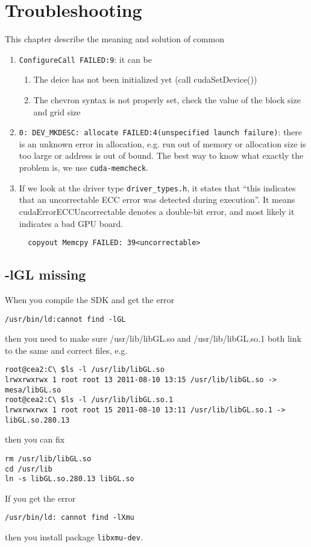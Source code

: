 
\chapter{Troubleshooting}
\label{chap:troubleshooting}


This chapter describe the  meaning and solution of common 
\begin{enumerate}
\item \verb!ConfigureCall FAILED:9!: it can be
  \begin{enumerate}
  \item The deice has not been initialized yet (call cudaSetDevice())
  \item The chevron syntax is not properly set, check the value of the
    block size and grid size
  \end{enumerate}

\item
  \verb!0: DEV_MKDESC: allocate FAILED:4(unspecified launch failure)!:
  there is an unknown error in allocation, e.g. run out of memory or allocation
  size is too large or address is out of bound. The best way to know what
  exactly the problem is, we use \verb!cuda-memcheck!. 
  
  \item If we look at the driver type \verb!driver_types.h!, it states that
  ``this indicates that an uncorrectable ECC error was detected during
  execution''. It means cudaErrorECCUncorrectable denotes a double-bit error,
  and most likely it indicates a bad GPU board. 
  \begin{verbatim}
  copyout Memcpy FAILED: 39<uncorrectable>
  \end{verbatim}
  
\end{enumerate}

\section{{\bf -lGL} missing}
\label{sec:lGL}

When you compile the SDK and get the error
\begin{verbatim}
/usr/bin/ld:cannot find -lGL
\end{verbatim}
then you need to make sure /usr/lib/libGL.so and /usr/lib/libGL.so.1 both link
to the same and correct files, e.g. 
\begin{verbatim}
root@cea2:C\ $ls -l /usr/lib/libGL.so
lrwxrwxrwx 1 root root 13 2011-08-10 13:15 /usr/lib/libGL.so -> mesa/libGL.so
root@cea2:C\ $ls -l /usr/lib/libGL.so.1
lrwxrwxrwx 1 root root 15 2011-08-10 13:11 /usr/lib/libGL.so.1 -> libGL.so.280.13
\end{verbatim}
then you can fix
\begin{verbatim}
rm /usr/lib/libGL.so
cd /usr/lib
ln -s libGL.so.280.13 libGL.so
\end{verbatim}

If you get the error
\begin{verbatim}
/usr/bin/ld: cannot find -lXmu
\end{verbatim}
then you install package \verb!libxmu-dev!. 


